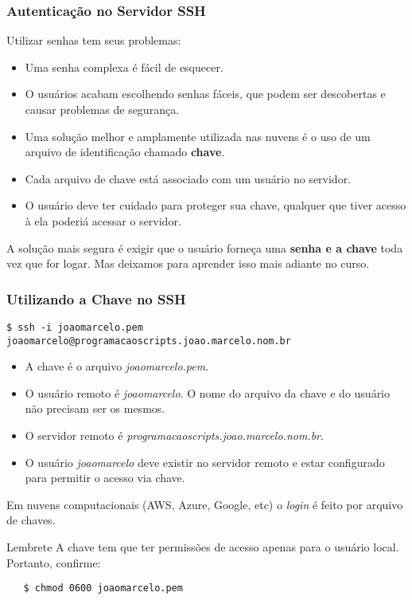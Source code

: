 \documentclass{beamer}
\begin{document}
\begin{frame}
   \frametitle{Autenticação no Servidor SSH}
   Utilizar senhas tem seus problemas:
   \begin{itemize}
      \item Uma senha complexa é fácil de esquecer.
      \item O usuários acabam escolhendo senhas fáceis, que podem ser descobertas e causar problemas de segurança.
      \item Uma solução melhor e amplamente utilizada nas nuvens é o uso de um arquivo de identificação chamado \textbf{chave}.
      \item Cada arquivo de chave está associado com um usuário no servidor.
      \item O usuário deve ter cuidado para proteger sua chave, qualquer que tiver acesso à ela poderiá acessar o servidor.
   \end{itemize}
   A solução mais segura é exigir que o usuário forneça uma \textbf{senha e a chave} toda vez que for logar. Mas deixamos para aprender isso mais adiante no curso.
\end{frame}

\begin{frame}[fragile]
   \frametitle{Utilizando a Chave no SSH}
   \scriptsize
   \begin{verbatim}
$ ssh -i joaomarcelo.pem joaomarcelo@programacaoscripts.joao.marcelo.nom.br   
   \end{verbatim}
   \normalsize
   \begin{itemize}
      \item A chave é o arquivo \textit{joaomarcelo.pem}.
      \item O usuário remoto é \textit{joaomarcelo}. O nome do arquivo da chave e do usuário não precisam ser os mesmos.
      \item O servidor remoto é \textit{programacaoscripts.joao.marcelo.nom.br}.
      \item O usuário \textit{joaomarcelo} deve existir no servidor remoto e estar configurado para permitir o acesso via chave.
   \end{itemize}
   Em nuvens computacionais (AWS, Azure, Google, etc) o \textit{login} é feito por arquivo de chaves.
   \begin{block}{Lembrete}
   A chave tem que ter permissões de acesso apenas para o usuário local. Portanto, confirme:
   \begin{verbatim}
   $ chmod 0600 joaomarcelo.pem
   \end{verbatim}
   \end{block}
\end{frame}
\end{document}
